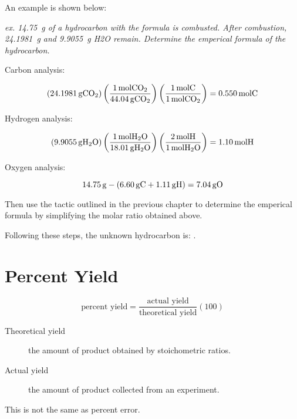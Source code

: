 An example is shown below:

\textit{ex. \SI{14.75}{\gram} of a hydrocarbon with the formula 
  is combusted. After combustion, \SI{24.1981}{\gram}  and \SI{9.9055}{\gram} \ce
{H2O} remain. Determine the emperical formula of the hydrocarbon.}

Carbon analysis: 

$$(\SI{24.1981}{\gram \ce{CO2}})\left(\frac{\SI{1}{\mol
\ce{CO2}}}{\SI{44.04}{\gram \ce{CO2}}}\right)\left(\frac{\SI{1}{\mol
\ce{C}}}{\SI{1}{\mol \ce{CO2}}}\right) = \SI{.550}{\mol \ce{C}}$$

Hydrogen analysis: 

$$(\SI{9.9055}{\gram \ce{H2O}})\left(\frac{\SI{1}{\mol
\ce{H2O}}}{\SI{18.01}{\gram \ce{H2O}}}\right)\left(\frac{\SI{2}{\mol
\ce{H}}}{\SI{1}{\mol \ce{H2O}}}\right) = \SI{1.10}{\mol \ce{H}}$$

Oxygen analysis:

$$\SI{14.75}{\gram} - (\SI{6.60}{\gram \ce{C}} + \SI{1.11}{\gram \ce{H}}) =
\SI{7.04}{\gram \ce{O}}$$

Then use the tactic outlined in the previous chapter to determine the emperical
formula by simplifying the molar ratio obtained above.

Following these steps, the unknown hydrocarbon is: .

\section{Percent Yield}
\begin{equation}
  \text{percent yield} = \frac{\text{actual yield}}{\text{theoretical
  yield}}(100)
\end{equation}

\begin{description}
  \item[Theoretical yield] the amount of product obtained by stoichometric
    ratios.
  \item[Actual yield] the amount of product collected from an experiment.
\end{description}

This is not the same as percent error.
